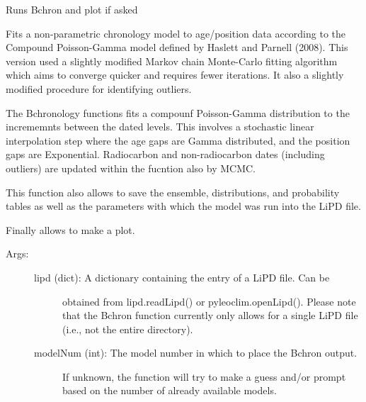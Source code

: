 \documentclass[letterpaper,10pt,english]{sphinxmanual}
\begin{document}
\begin{fulllineitems}
\label{\detokenize{Main:pyleoclim.Bchron}}
Runs Bchron and plot if asked

Fits a non-parametric chronology model to age/position data according to
the Compound Poisson-Gamma model defined by Haslett and Parnell (2008). 
This version used a slightly modified Markov chain Monte-Carlo fitting
algorithm which aims to converge quicker and requires fewer iterations.
It also a slightly modified procedure for identifying outliers.

The Bchronology functions fits a compounf Poisson-Gamma distribution to the
incrememnts between the dated levels. This involves a stochastic linear
interpolation step where the age gaps are Gamma distributed, and the position
gaps are Exponential. Radiocarbon and non-radiocarbon dates (including outliers)
are updated within the fucntion also by MCMC.

This function also allows to save the ensemble, distributions, and probability
tables as well as the parameters with which the model was run into the LiPD file.

Finally allows to make a plot.
\begin{description}
\item[{Args:}] \leavevmode\begin{description}
\item[{lipd (dict): A dictionary containing the entry of a LiPD file. Can be}] \leavevmode
obtained from lipd.readLipd() or pyleoclim.openLipd(). Please note
that the Bchron function currently only allows for a single LiPD file
(i.e., not the entire directory).

\item[{modelNum (int): The model number in which to place the Bchron output. }] \leavevmode
If unknown, the function will try to make a guess and/or prompt
based on the number of already available models.


\end{description}
\end{description}
\end{fulllineitems}
\end{document}

